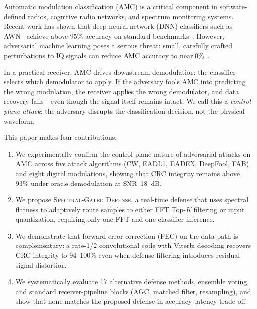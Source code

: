 \documentclass[letterpaper,twocolumn,10pt]{article}
\begin{document}
Automatic modulation classification (AMC) is a critical component in
software-defined radios, cognitive radio networks, and spectrum monitoring
systems. Recent work has shown that deep neural network (DNN) classifiers
such as AWN~\cite{li2023awn} achieve above 95\% accuracy on standard
benchmarks~\cite{otoole2016rml}. However, adversarial machine learning
poses a serious threat: small, carefully crafted perturbations to IQ
signals can reduce AMC accuracy to near 0\%~\cite{lin2020tactics,
silvaco2023adversarial_rf}.

In a practical receiver, AMC drives downstream demodulation: the
classifier selects which demodulator to apply. If the adversary fools
AMC into predicting the wrong modulation, the receiver applies the
wrong demodulator, and data recovery fails---even though the signal
itself remains intact. We call this a \emph{control-plane attack}:
the adversary disrupts the classification decision, not the physical
waveform.

This paper makes four contributions:

\begin{enumerate}
\item We experimentally confirm the control-plane nature of adversarial
  attacks on AMC across five attack algorithms (CW, EADL1, EADEN,
  DeepFool, FAB) and eight digital modulations, showing that CRC
  integrity remains above 93\% under oracle demodulation at SNR~18~dB.

\item We propose \textsc{Spectral-Gated Defense}, a real-time defense
  that uses spectral flatness to adaptively route samples to either
  FFT Top-$K$ filtering or input quantization, requiring only one FFT
  and one classifier inference.

\item We demonstrate that forward error correction (FEC) on the
  data path is complementary: a rate-1/2 convolutional code with
  Viterbi decoding recovers CRC integrity to 94--100\% even when
  defense filtering introduces residual signal distortion.

\item We systematically evaluate 17 alternative defense methods,
  ensemble voting, and standard receiver-pipeline blocks (AGC,
  matched filter, resampling), and show that none matches the
  proposed defense in accuracy--latency trade-off.
\end{enumerate}

\end{document}
